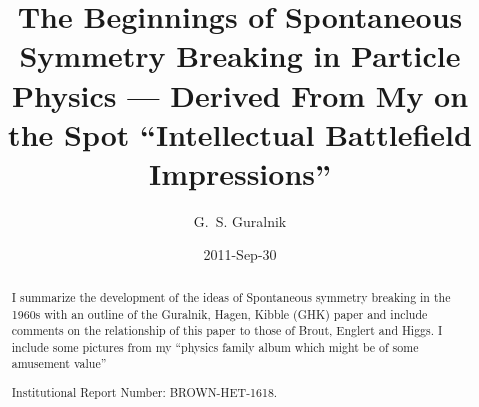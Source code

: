 \documentclass[letterpaper,twoside,preprintnumbers,slac_one]{revtex4}
\begin{document}

\title{The Beginnings of Spontaneous Symmetry Breaking in Particle
  Physics --- Derived From My on the Spot ``Intellectual Battlefield Impressions''}

\author{G.~S. Guralnik}
\date{2011-Sep-30}
%
%
\begin{abstract}
I summarize the development of the ideas of Spontaneous symmetry
breaking in the 1960s with an outline of the Guralnik, Hagen, Kibble
(GHK) paper and include comments on the relationship of this paper to
those of Brout, Englert and Higgs. I include some pictures from my ``physics
family album which might be of some amusement value''
\smallskip

Institutional Report Number: BROWN-HET-1618.
\end{abstract}

\maketitle

\thispagestyle{fancy}


\end{document}
